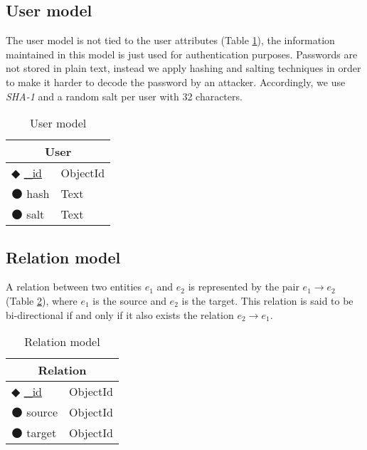 \subsection{User model}

The user model is not tied to the user attributes (Table \ref{table:user}), the information maintained in this model is just used for authentication purposes. Passwords are not stored in plain text, instead we apply hashing and salting techniques \cite{password} in order to make it harder to decode the password by an attacker. Accordingly, we use \emph{SHA-1} and a random salt per user with 32 characters.

\begin{table}
\centering
\caption{User model}
\label{table:user}
    \begin{tabular}{|ll|}
        \hline
        \multicolumn{2}{|c|}{\textbf{User}}         \\ \hline
        $\Diamondblack$ \underline{\_id}  & ObjectId  \\ 
        $\medbullet$ hash           & Text          \\ 
        $\medbullet$ salt      & Text               \\ \hline
    \end{tabular}
\end{table}

\subsection{Relation model}

A relation between two entities $e_1$ and $e_2$ is represented by the pair $e_1\rightarrow e_2$ (Table \ref{table:relation}), where $e_1$ is the source and $e_2$ is the target. This relation is said to be bi-directional if and only if it also exists the relation $e_2\rightarrow e_1$.

\begin{table}
\centering
\caption{Relation model}
\label{table:relation}
    \begin{tabular}{|ll|}
        \hline
        \multicolumn{2}{|c|}{\textbf{Relation}}     \\ \hline
        $\Diamondblack$ \underline{\_id}  & ObjectId  \\ 
        $\medbullet$ source           & ObjectId    \\ 
        $\medbullet$ target      & ObjectId         \\ \hline
    \end{tabular}
\end{table}

